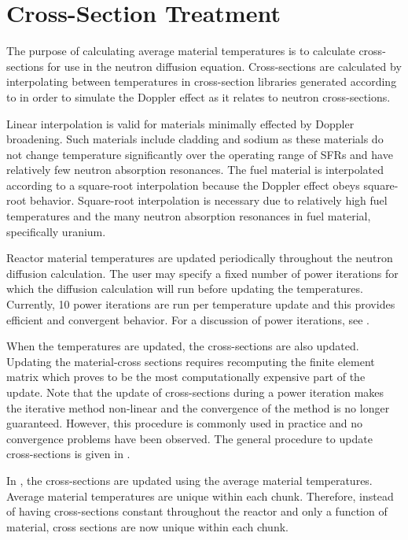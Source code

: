 \section{Cross-Section Treatment}
  The purpose of calculating average material temperatures is to calculate
  cross-sections for use in the neutron diffusion equation. Cross-sections are
  calculated by interpolating between temperatures in cross-section libraries
  generated according to  in order to simulate
  the Doppler effect as it relates to neutron cross-sections.

  Linear interpolation is valid for materials minimally effected by Doppler 
  broadening. Such materials include cladding and sodium as these materials do 
  not change temperature significantly over the operating range of SFRs
  and have relatively few neutron absorption resonances. The fuel material is 
  interpolated according to a square-root interpolation because the Doppler 
  effect obeys square-root behavior. Square-root interpolation is necessary
  due to relatively high fuel temperatures and the many neutron absorption 
  resonances in fuel material, specifically uranium.

  Reactor material temperatures are updated periodically throughout the 
  neutron diffusion calculation. The user may specify a fixed number of power
  iterations for which the diffusion calculation will run before updating the
  temperatures. Currently, 10 power iterations are run per temperature update
  and this provides efficient and convergent behavior.
  For a discussion of power iterations, see .
  
  When
  the temperatures are updated, the cross-sections are also updated. Updating
  the material-cross sections requires recomputing the finite element matrix
  which proves to be the most computationally expensive part of the update. 
  Note that the update of cross-sections during a power iteration makes the
  iterative method non-linear and the convergence of the method is no longer
  guaranteed. However, this procedure is commonly used in practice and no 
  convergence problems have been observed. The general procedure to update
  cross-sections is given in .

  In , the cross-sections are
  updated using the average material temperatures. Average material
  temperatures are unique within each chunk. Therefore, instead of having
  cross-sections constant throughout the reactor and only a function of
  material, cross sections are now unique within each chunk.

